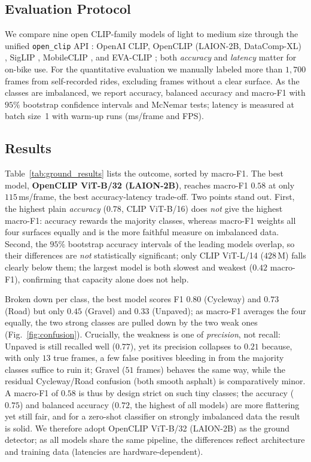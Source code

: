 \documentclass[letterpaper,journal]{IEEEtran}
\begin{document}
\subsection{Evaluation Protocol}
We compare nine open CLIP-family models of light to medium size through
the unified \texttt{open\_clip} API \cite{openclip}: OpenAI CLIP,
OpenCLIP (LAION-2B, DataComp-XL) \cite{datacomp}, SigLIP \cite{siglip},
MobileCLIP \cite{mobileclip}, and EVA-CLIP \cite{evaclip}; both
\emph{accuracy} and \emph{latency} matter for on-bike use. For the
quantitative evaluation we manually labeled more than $1{,}700$ frames
from self-recorded rides, excluding frames without a clear surface. As
the classes are imbalanced, we report accuracy, balanced accuracy and
macro-F1 with $95\%$ bootstrap confidence intervals and McNemar tests;
latency is measured at batch size~1 with warm-up runs (ms/frame and
FPS).

\subsection{Results}
Table~\ref{tab:ground_results} lists the outcome, sorted by macro-F1.
The best model, \textbf{OpenCLIP ViT-B/32 (LAION-2B)}, reaches macro-F1
$0.58$ at only $115$\,ms/frame, the best accuracy-latency trade-off.
Two points stand out. First, the highest plain \emph{accuracy}
($0.78$, CLIP ViT-B/16) does \emph{not} give the highest macro-F1:
accuracy rewards the majority classes, whereas macro-F1 weights all four
surfaces equally and is the more faithful measure on imbalanced data.
Second, the $95\%$ bootstrap accuracy intervals of the leading
models overlap, so their differences are \emph{not} statistically
significant; only CLIP ViT-L/14 ($428$\,M) falls clearly below them;
the largest model is both slowest and weakest ($0.42$ macro-F1),
confirming that capacity alone does not help.

Broken down per class, the best model scores F1 $0.80$ (Cycleway) and
$0.73$ (Road) but only $0.45$ (Gravel) and $0.33$ (Unpaved); as
macro-F1 averages the four equally, the two strong classes are pulled
down by the two weak ones (Fig.~\ref{fig:confusion}). Crucially, the
weakness is one of \emph{precision}, not recall: Unpaved is still
recalled well ($0.77$), yet its precision collapses to $0.21$ because,
with only $13$ true frames, a few false positives bleeding in from the
majority classes suffice to ruin it; Gravel ($51$ frames) behaves the
same way, while the residual Cycleway/Road confusion (both smooth
asphalt) is comparatively minor. A macro-F1 of $0.58$ is thus by
design strict on such tiny classes; the accuracy ($0.75$) and balanced
accuracy ($0.72$, the highest of all models) are more flattering yet
still fair, and for a zero-shot classifier on strongly imbalanced data
the result is solid. We therefore adopt OpenCLIP ViT-B/32 (LAION-2B) as
the ground detector; as all models share the same pipeline, the
differences reflect architecture and training data (latencies are
hardware-dependent).
\end{document}
